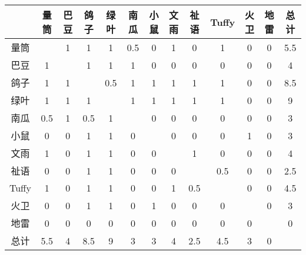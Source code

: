 \documentclass[12pt]{article}
\begin{document}
\begin{table}
\centering
\begin{tabular}{c|*{12}{c}}
 & 量筒 & 巴豆 & 鸽子 & 绿叶 & 南瓜 & 小鼠 & 文雨 & 祉语 & Tuffy & 火卫 & 地雷 & 总计 \\
\hline
量筒 & & 1 & 1 & 1 & 0.5 & 0 & 1 & 0 & 1 & 0 & 0 & 5.5 \\
巴豆 & 1 & & 1 & 1 & 1 & 0 & 0 & 0 & 0 & 0 & 0 & 4 \\
鸽子 & 1 & 1 & & 0.5 & 1 & 1 & 1 & 1 & 1 & 0 & 0 & 8.5 \\
绿叶 & 1 & 1 & 1 & & 1 & 1 & 1 & 1 & 1 & 0 & 0 & 9 \\
南瓜 & 0.5 & 1 & 0.5 & 1 & & 0 & 0 & 0 & 0 & 0 & 0 & 3 \\
小鼠 & 0 & 0 & 1 & 1 & 0 & & 0 & 0 & 0 & 1 & 0 & 3 \\
文雨 & 1 & 0 & 1 & 1 & 0 & 0 & & 1 & 0 & 0 & 0 & 4 \\
祉语 & 0 & 0 & 1 & 1 & 0 & 0 & 0 & & 0.5 & 0 & 0 & 2.5 \\
Tuffy & 1 & 0 & 1 & 1 & 0 & 0 & 1 & 0.5 & & 0 & 0 & 4.5 \\
火卫 & 0 & 0 & 1 & 1 & 0 & 1 & 0 & 0 & 0 & & 0 & 3 \\
地雷 & 0 & 0 & 0 & 0 & 0 & 0 & 0 & 0 & 0 & 0 & & 0 \\
总计 & 5.5 & 4 & 8.5 & 9 & 3 & 3 & 4 & 2.5 & 4.5 & 3 & 0 & \\
\end{tabular}
\end{table}
\end{document}
